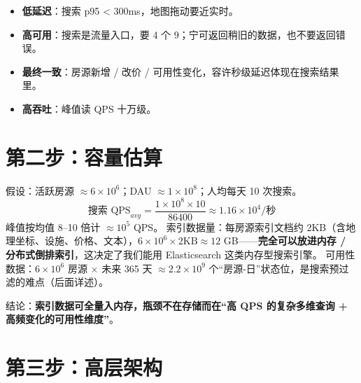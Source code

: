 \begin{itemize}
  \item \textbf{低延迟}：搜索 p95 < 300ms，地图拖动要近实时。
  \item \textbf{高可用}：搜索是流量入口，要 4 个 9；宁可返回稍旧的数据，也不要返回错误。
  \item \textbf{最终一致}：房源新增 / 改价 / 可用性变化，容许秒级延迟体现在搜索结果里。
  \item \textbf{高吞吐}：峰值读 QPS 十万级。
\end{itemize}

\section{第二步：容量估算}

\begin{keypoint}
假设：活跃房源 $\approx 6\times10^6$；DAU $\approx 1\times10^8$；人均每天 10 次搜索。
\[
  \text{搜索 QPS}_{avg} = \frac{1\times10^8 \times 10}{86400} \approx 1.16\times10^4 \text{/秒}
\]
峰值按均值 8--10 倍计 $\approx 10^5$ QPS。
索引数据量：每房源索引文档约 2KB（含地理坐标、设施、价格、文本），$6\times10^6 \times 2\text{KB} \approx 12$ GB——\textbf{完全可以放进内存 / 分布式倒排索引}，这决定了我们能用 Elasticsearch 这类内存型搜索引擎。
可用性数据：$6\times10^6$ 房源 $\times$ 未来 365 天 $\approx 2.2\times10^9$ 个“房源-日”状态位，是搜索预过滤的难点（后面详述）。
\end{keypoint}

结论：\textbf{索引数据可全量入内存，瓶颈不在存储而在“高 QPS 的复杂多维查询 + 高频变化的可用性维度”}。

\section{第三步：高层架构}

